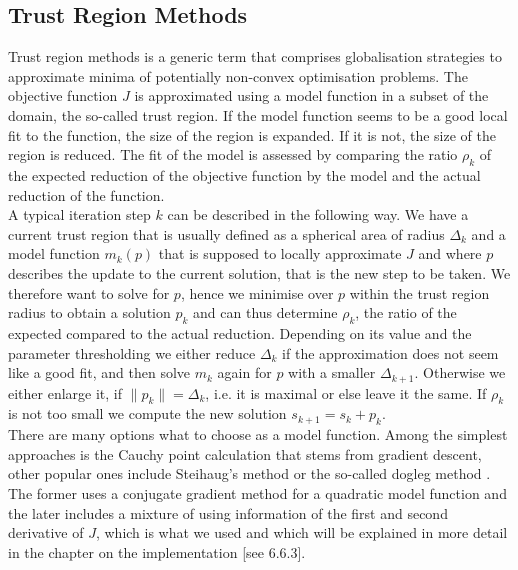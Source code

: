 \documentclass[../draft_1.tex]{subfiles}
\begin{document}
\subsection{Trust Region Methods}

Trust region methods is a generic term that comprises globalisation strategies to approximate minima of potentially non-convex optimisation problems. The objective function $J$ is approximated using a model function in a subset of the domain, the so-called trust region. If the model function seems to be a good local fit to the function, the size of the region is expanded. If it is not, the size of the region is reduced. The fit of the model is assessed by comparing the ratio $\rho_k$ of the expected reduction of the objective function by the model and the actual reduction of the function. 
\smallskip
\\
A typical iteration step $k$ can be described in the following way. We have a current trust region that is usually defined as a spherical area of radius $\Delta_k$ and a model function $m_k(p)$ that is supposed to locally approximate $J$ and where $p$ describes the update to the current solution, that is the new step to be taken. We therefore want to solve for $p$, hence we minimise over $p$ within the trust region radius to obtain a solution $p_k$ and can thus determine $\rho_k$, the ratio of the expected compared to the actual reduction. Depending on its value and the parameter thresholding we either reduce $\Delta_k$ if the approximation does not seem like a good fit, and then solve $m_k$ again for $p$ with a smaller $\Delta_{k+1}$. Otherwise we either enlarge it, if $\| p_k \| = \Delta_k$, i.e. it is maximal or else leave it the same. If $\rho_k$ is not too small we compute the new solution $s_{k+1} = s_k + p_k$. 
\smallskip
\\
There are many options what to choose as a model function. Among the simplest approaches is the Cauchy point calculation that stems from gradient descent, other popular ones include Steihaug's method or the so-called dogleg method \cite{NoceWrig99}. The former uses a conjugate gradient method for a quadratic model function and the later includes a mixture of using information of the first and second derivative of $J$, which is what we used and which will be explained in more detail in the chapter on the implementation [see 6.6.3].
 
\end{document}
